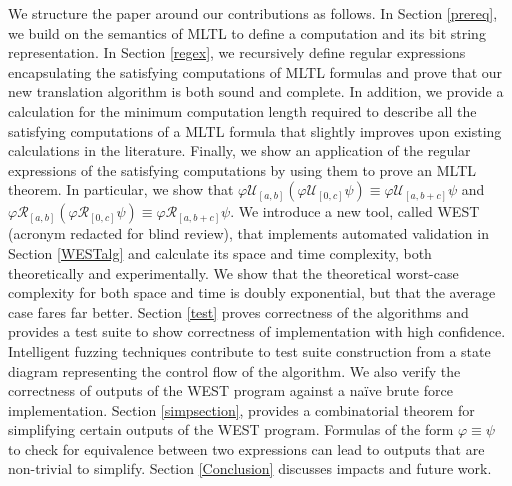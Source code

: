 \documentclass[runningheads]{llncs}
\renewcommand{\phi}{\varphi}
\begin{document}
We structure the paper around our contributions as follows. In Section \ref{prereq}, we build on the semantics of MLTL to define a computation and its bit string representation. %
%
In Section \ref{regex}, we recursively define regular expressions encapsulating the satisfying computations of MLTL formulas and prove that our new translation algorithm is both sound and complete. In addition, we provide a calculation for the minimum computation length required to describe all the satisfying computations of a MLTL formula that slightly improves upon existing calculations in the literature. Finally, we show an application of the regular expressions of the satisfying computations by using them to prove an MLTL theorem. In particular, we show that $\phi\mathcal{U}_{[a,b]}(\phi\mathcal{U}_{[0,c]}\psi) \equiv \phi\mathcal{U}_{[a,b+c]}\psi$ and $\phi\mathcal{R}_{[a,b]}(\phi\mathcal{R}_{[0,c]}\psi) \equiv \phi\mathcal{R}_{[a,b+c]}\psi$.
%
We introduce a new tool, called WEST (acronym redacted for blind review), that implements automated validation in Section \ref{WESTalg}
and calculate its space and time complexity, both theoretically and experimentally. We show that the theoretical worst-case complexity for both space and time is doubly exponential, but that the average case fares far better.
%
Section \ref{test} proves correctness of the algorithms and provides a test suite to show correctness of implementation with high confidence. Intelligent fuzzing techniques contribute to test suite construction from a state diagram representing the control flow of the algorithm. We also verify the correctness of outputs of the WEST program against a na\"ive brute force implementation.
%
Section \ref{simpsection}, provides a combinatorial theorem for simplifying certain outputs of the WEST program. Formulas of the form $\phi \equiv \psi$ to check for equivalence between two expressions can lead to outputs that are non-trivial to simplify. Section \ref{Conclusion} discusses impacts and future work. 

\vspace{-0.1in}
\end{document}
